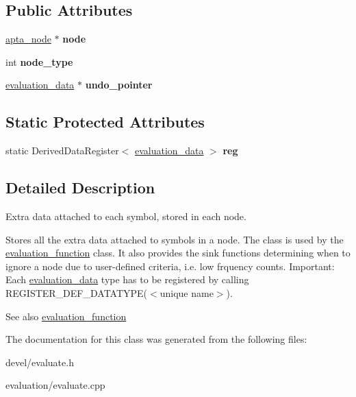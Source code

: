 \subsection*{Public Attributes}
\begin{DoxyCompactItemize}
\item 
\hyperlink{classapta__node}{apta\+\_\+node} $\ast$ {\bfseries node}\hypertarget{classevaluation__data_ac0bbf719fd344e835e98ba25e5b29e1a}{}\label{classevaluation__data_ac0bbf719fd344e835e98ba25e5b29e1a}

\item 
int {\bfseries node\+\_\+type}\hypertarget{classevaluation__data_aa0838506c61ba0400cde7cb71bbcf449}{}\label{classevaluation__data_aa0838506c61ba0400cde7cb71bbcf449}

\item 
\hyperlink{classevaluation__data}{evaluation\+\_\+data} $\ast$ {\bfseries undo\+\_\+pointer}\hypertarget{classevaluation__data_a57cf2269f5aff06e706eebd8445f90c5}{}\label{classevaluation__data_a57cf2269f5aff06e706eebd8445f90c5}

\end{DoxyCompactItemize}
\subsection*{Static Protected Attributes}
\begin{DoxyCompactItemize}
\item 
static Derived\+Data\+Register$<$ \hyperlink{classevaluation__data}{evaluation\+\_\+data} $>$ {\bfseries reg}\hypertarget{classevaluation__data_a52cafd1bbf5be3383eddb5be5c9cc327}{}\label{classevaluation__data_a52cafd1bbf5be3383eddb5be5c9cc327}

\end{DoxyCompactItemize}


\subsection{Detailed Description}
Extra data attached to each symbol, stored in each node. 

Stores all the extra data attached to symbols in a node. The class is used by the \hyperlink{classevaluation__function}{evaluation\+\_\+function} class. It also provides the sink functions determining when to ignore a node due to user-\/defined criteria, i.\+e. low frquency counts. Important\+: Each \hyperlink{classevaluation__data}{evaluation\+\_\+data} type has to be registered by calling R\+E\+G\+I\+S\+T\+E\+R\+\_\+\+D\+E\+F\+\_\+\+D\+A\+T\+A\+T\+Y\+P\+E($<$unique name$>$). \begin{DoxySeeAlso}{See also}
\hyperlink{classevaluation__function}{evaluation\+\_\+function} 
\end{DoxySeeAlso}


The documentation for this class was generated from the following files\+:\begin{DoxyCompactItemize}
\item 
devel/evaluate.\+h\item 
evaluation/evaluate.\+cpp\end{DoxyCompactItemize}

